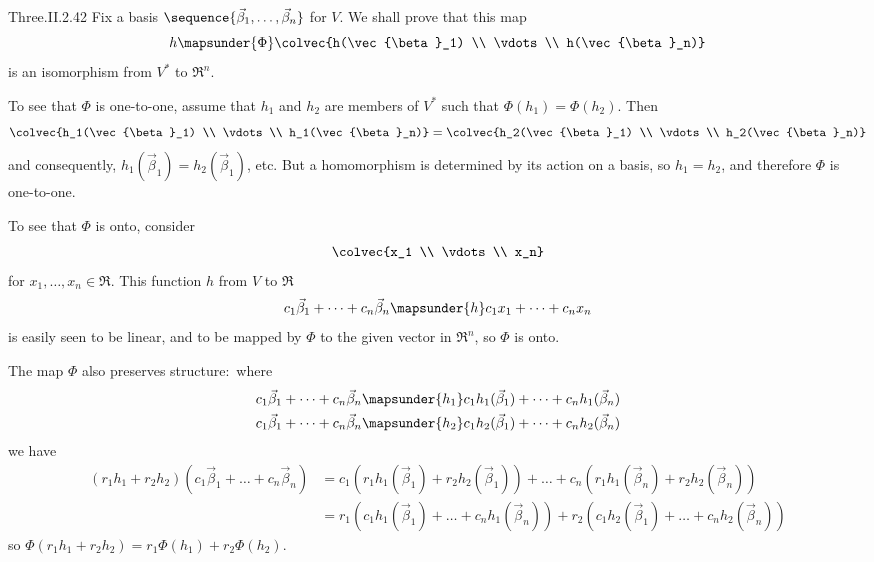 \begin{ans}{Three.II.2.42}
      Fix a basis \( \sequence{\vec{\beta}_1,\dots,\vec{\beta}_n} \)
      for \( V \).
      We shall prove that this map
      \begin{equation*}
        h\mapsunder{\Phi}
        \colvec{h(\vec{\beta}_1) \\ \vdots \\ h(\vec{\beta}_n)}
      \end{equation*}
      is an isomorphism from \( V^\ast \) to \( \Re^n \).

      To see that $\Phi$ is one-to-one, assume that $h_1$ and $h_2$ are
      members of $V^\ast$ such that $\Phi(h_1)=\Phi(h_2)$.
      Then
      \begin{equation*}
        \colvec{h_1(\vec{\beta}_1) \\ \vdots \\ h_1(\vec{\beta}_n)}
        =\colvec{h_2(\vec{\beta}_1) \\ \vdots \\ h_2(\vec{\beta}_n)}
      \end{equation*}
      and consequently, $h_1(\vec{\beta}_1)=h_2(\vec{\beta}_1)$, etc.
      But a homomorphism is determined by its action on a basis, so
      \( h_1=h_2 \), and therefore \( \Phi \) is one-to-one.

      To see that $\Phi$ is onto, consider
      \begin{equation*}
        \colvec{x_1 \\ \vdots \\ x_n}
      \end{equation*}
      for \( x_1,\ldots,x_n\in\Re \).
      This function $h$ from $V$ to $\Re$
      \begin{equation*}
        c_1\vec{\beta}_1+\dots+c_n\vec{\beta}_n
        \mapsunder{h} c_1x_1+\dots+c_nx_n
      \end{equation*}
      is easily seen to be linear, and to be mapped by $\Phi$ to the
      given vector in $\Re^n$, so \( \Phi \) is onto.

      The map \( \Phi \) also preserves structure:~where
      \begin{align*}
        c_1\vec{\beta}_1+\dots+c_n\vec{\beta}_n
        &\mapsunder{h_1}
        c_1h_1(\vec{\beta}_1)+\dots+c_nh_1(\vec{\beta}_n)    \\
        c_1\vec{\beta}_1+\dots+c_n\vec{\beta}_n
        &\mapsunder{h_2}
        c_1h_2(\vec{\beta}_1)+\dots+c_nh_2(\vec{\beta}_n)
      \end{align*}
      we have
      \begin{align*}
        (r_1h_1+r_2h_2)(c_1\vec{\beta}_1+\dots+c_n\vec{\beta}_n)
        &=
        c_1(r_1h_1(\vec{\beta}_1)+r_2h_2(\vec{\beta}_1))
          +\dots
          +c_n(r_1h_1(\vec{\beta}_n)+r_2h_2(\vec{\beta}_n))    \\
        &=
        r_1(c_1h_1(\vec{\beta}_1)+\dots+c_nh_1(\vec{\beta}_n))
          + r_2(c_1h_2(\vec{\beta}_1)+\dots+c_nh_2(\vec{\beta}_n))
      \end{align*}
      so \( \Phi(r_1h_1+r_2h_2)=r_1\Phi(h_1)+r_2\Phi(h_2) \).
    
\end{ans}
